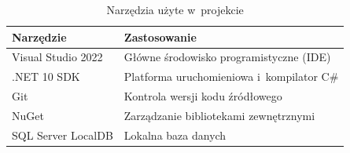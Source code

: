 \begin{table}[H]
\centering
\caption{Narz\k{e}dzia u\.{z}yte w~projekcie}
\label{tab:narzedzia}
\begin{tabular}{|l|l|}
\hline
\textbf{Narz\k{e}dzie} & \textbf{Zastosowanie} \\
\hline
Visual Studio 2022  & G\l{}\'{o}wne \'{s}rodowisko programistyczne (IDE) \\
.NET 10 SDK         & Platforma uruchomieniowa i~kompilator C\# \\
Git                 & Kontrola wersji kodu \'{z}r\'{o}d\l{}owego \\
NuGet               & Zarz\k{a}dzanie bibliotekami zewn\k{e}trznymi \\
SQL Server LocalDB  & Lokalna baza danych \\
\hline
\end{tabular}
\end{table}

